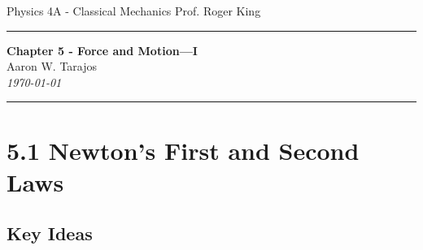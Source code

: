 \documentclass{article}
\begin{document}
\noindent
Physics 4A - Classical Mechanics \hfill Prof. Roger King

\noindent\rule{\textwidth}{0.4pt}

\begin{center}
    \textbf{\LARGE Chapter 5 - Force and Motion—I} \\
    \vspace{12pt}
    \large Aaron W. Tarajos \\
    \textit{\today}
\end{center}

\noindent\rule{\textwidth}{0.4pt}

\section*{5.1 Newton's First and Second Laws}
\subsection*{Key Ideas}
\end{document}
